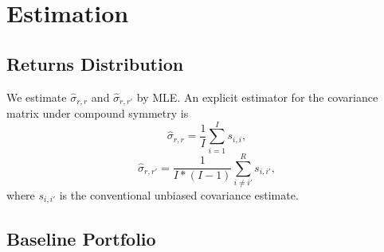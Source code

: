 \documentclass[3p,times,twocolumn]{elsarticle}
\begin{document}
\appendix

\section{Estimation}

\subsection{Returns Distribution}\label{appendix:returns_distribution}

We estimate $\widehat{\sigma}_{r,r}$ and $\widehat{\sigma}_{r,r'}$ by MLE.
An explicit estimator for the covariance matrix under compound symmetry \citep[see][p. 95]{seberMultivariateObservations1984} is
\begin{equation}
    \widehat{\sigma}_{r,r}=\dfrac{1}{I}\sum_{i=1}^{I}s_{i,i},
\end{equation}
\begin{equation}
    \widehat{\sigma}_{r,r'}=\dfrac{1}{I*(I-1)}\sum_{i\neq i'}^{R}s_{i,i'},
\end{equation}
where $s_{i,i'}$ is the conventional unbiased covariance estimate.

\subsection{Baseline Portfolio}\label{appendix:baseline_portfolio}
\end{document}
